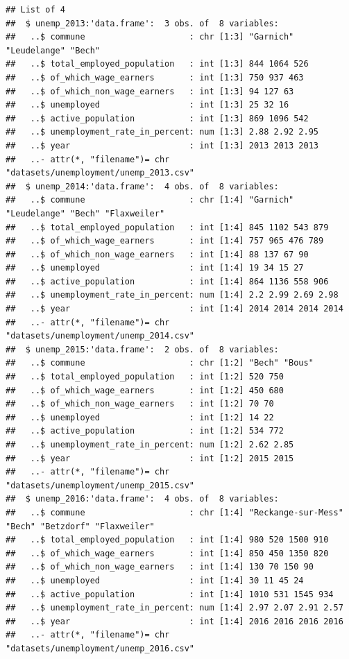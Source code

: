\documentclass[
]{article}
\begin{document}
\begin{verbatim}
## List of 4
##  $ unemp_2013:'data.frame':  3 obs. of  8 variables:
##   ..$ commune                     : chr [1:3] "Garnich" "Leudelange" "Bech"
##   ..$ total_employed_population   : int [1:3] 844 1064 526
##   ..$ of_which_wage_earners       : int [1:3] 750 937 463
##   ..$ of_which_non_wage_earners   : int [1:3] 94 127 63
##   ..$ unemployed                  : int [1:3] 25 32 16
##   ..$ active_population           : int [1:3] 869 1096 542
##   ..$ unemployment_rate_in_percent: num [1:3] 2.88 2.92 2.95
##   ..$ year                        : int [1:3] 2013 2013 2013
##   ..- attr(*, "filename")= chr "datasets/unemployment/unemp_2013.csv"
##  $ unemp_2014:'data.frame':  4 obs. of  8 variables:
##   ..$ commune                     : chr [1:4] "Garnich" "Leudelange" "Bech" "Flaxweiler"
##   ..$ total_employed_population   : int [1:4] 845 1102 543 879
##   ..$ of_which_wage_earners       : int [1:4] 757 965 476 789
##   ..$ of_which_non_wage_earners   : int [1:4] 88 137 67 90
##   ..$ unemployed                  : int [1:4] 19 34 15 27
##   ..$ active_population           : int [1:4] 864 1136 558 906
##   ..$ unemployment_rate_in_percent: num [1:4] 2.2 2.99 2.69 2.98
##   ..$ year                        : int [1:4] 2014 2014 2014 2014
##   ..- attr(*, "filename")= chr "datasets/unemployment/unemp_2014.csv"
##  $ unemp_2015:'data.frame':  2 obs. of  8 variables:
##   ..$ commune                     : chr [1:2] "Bech" "Bous"
##   ..$ total_employed_population   : int [1:2] 520 750
##   ..$ of_which_wage_earners       : int [1:2] 450 680
##   ..$ of_which_non_wage_earners   : int [1:2] 70 70
##   ..$ unemployed                  : int [1:2] 14 22
##   ..$ active_population           : int [1:2] 534 772
##   ..$ unemployment_rate_in_percent: num [1:2] 2.62 2.85
##   ..$ year                        : int [1:2] 2015 2015
##   ..- attr(*, "filename")= chr "datasets/unemployment/unemp_2015.csv"
##  $ unemp_2016:'data.frame':  4 obs. of  8 variables:
##   ..$ commune                     : chr [1:4] "Reckange-sur-Mess" "Bech" "Betzdorf" "Flaxweiler"
##   ..$ total_employed_population   : int [1:4] 980 520 1500 910
##   ..$ of_which_wage_earners       : int [1:4] 850 450 1350 820
##   ..$ of_which_non_wage_earners   : int [1:4] 130 70 150 90
##   ..$ unemployed                  : int [1:4] 30 11 45 24
##   ..$ active_population           : int [1:4] 1010 531 1545 934
##   ..$ unemployment_rate_in_percent: num [1:4] 2.97 2.07 2.91 2.57
##   ..$ year                        : int [1:4] 2016 2016 2016 2016
##   ..- attr(*, "filename")= chr "datasets/unemployment/unemp_2016.csv"
\end{verbatim}
\end{document}
